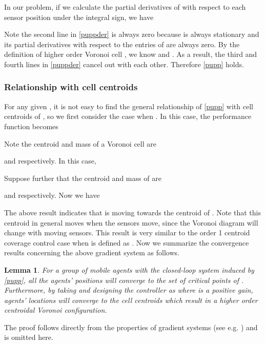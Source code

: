 \documentclass[letterpaper, 10 pt, conference]{ieeeconf}
\newtheorem{lemma}{Lemma}
\begin{document}
In our problem, if we calculate the partial derivatives of  with respect to each sensor position  under the integral sign, we have




Note the second line in \eqref{puppder} is always zero because  is always stationary and its partial derivatives with respect to the entries of  are always zero. By the definition of higher order Voronoi cell \cite{shamos1975closest}, we know  and . As a result, the third and fourth lines in \eqref{puppder} cancel out with each other. Therefore \eqref{pupp} holds.

\subsubsection{Relationship with cell centroids}

For any given , it is not easy to find the general relationship of \eqref{pupp} with cell centroids of , so we first consider the case when
. In this case, the performance function becomes 

Note the centroid and mass of a Voronoi cell  are

and  respectively.
In this case,


Suppose further that the centroid and mass of  are

and  respectively.
Now we have

The above result indicates that  is moving towards the centroid of .
Note that this centroid in general moves when the sensors move, since the Voronoi diagram will change with moving sensors.
This result is very similar to the order 1 centroid coverage control case when  is defined as . Now we summarize the convergence results concerning the above gradient system as follows.

\begin{lemma}
For a group of mobile agents with the closed-loop system induced by  \eqref{pupp}, all the agents' positions  will  converge to
the set of critical points of . Furthermore, by taking  and designing the controller as  where  is a positive gain, agents' locations will converge to the cell centroids which result in a higher order  centroidal  Voronoi configuration.
\end{lemma}

The proof follows directly from the properties of gradient systems (see e.g. \cite{absil2006stable}) and is omitted here.
\end{document}
